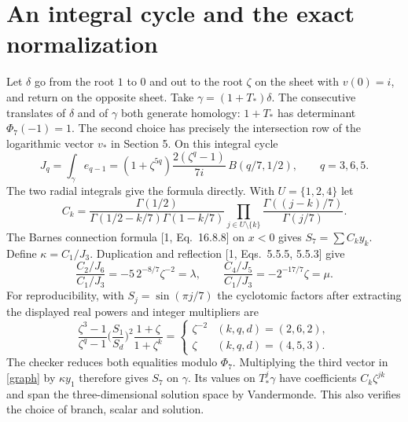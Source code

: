 \documentclass[10pt]{article}
\begin{document}
\section{An integral cycle and the exact normalization}
Let $\delta$ go from the root $1$ to $0$ and out to the root $\zeta$ on the sheet with $v(0)=i$, and return on the opposite sheet. Take $\gamma=(1+T_*)\delta$. The consecutive translates of $\delta$ and of $\gamma$ both generate homology: $1+T_*$ has determinant $\Phi_7(-1)=1$. The second choice has precisely the intersection row of the logarithmic vector $v_*$ in Section 5. On this integral cycle
\[
 J_q=\int_\gamma e_{q-1}
 =(1+\zeta^{5q})\frac{2(\zeta^q-1)}{7i}\,
 B(q/7,1/2),\qquad q=3,6,5 .
\]
The two radial integrals give the formula directly. With $U=\{1,2,4\}$ let
\[
 C_k=\frac{\Gamma(1/2)}
 {\Gamma(1/2-k/7)\Gamma(1-k/7)}
 \prod_{j\in U\setminus\{k\}}\frac{\Gamma((j-k)/7)}{\Gamma(j/7)} .
\]
The Barnes connection formula [1, Eq.~16.8.8] on $x<0$ gives $S_7=\sum C_k y_k$. Define $\kappa=C_1/J_3$. Duplication and reflection [1, Eqs.~5.5.5, 5.5.3] give
\[
 \frac{C_2/J_6}{C_1/J_3}=-5\,2^{-8/7}\zeta^{-2}=\lambda,\qquad
 \frac{C_4/J_5}{C_1/J_3}=-2^{-17/7}\zeta=\mu .
\]
For reproducibility, with $S_j=\sin(\pi j/7)$ the cyclotomic factors after extracting the displayed real powers and integer multipliers are
\[
 \frac{\zeta^3-1}{\zeta^q-1}
 \bigg(\frac{S_1}{S_d}\bigg)^2
 \frac{1+\zeta}{1+\zeta^k}
 =\begin{cases}\zeta^{-2}&(k,q,d)=(2,6,2),\\
                 \zeta&(k,q,d)=(4,5,3).
   \end{cases}
\]
The checker reduces both equalities modulo $\Phi_7$. Multiplying the third vector in \eqref{graph} by $\kappa y_1$ therefore gives $S_7$ on $\gamma$. Its values on $T_*^j\gamma$ have coefficients $C_k\zeta^{jk}$ and span the three-dimensional solution space by Vandermonde. This also verifies the choice of branch, scalar and solution.
\end{document}
